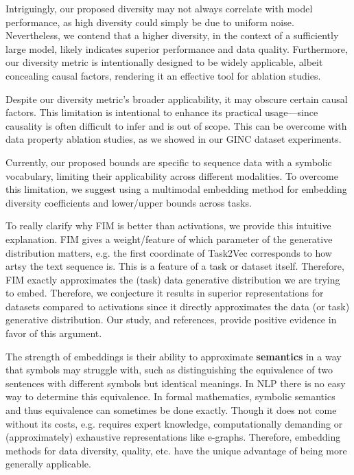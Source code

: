 Intriguingly, our proposed diversity may not always correlate with model performance, as high diversity could simply be due to uniform noise. 
Nevertheless, we contend that a higher diversity, in the context of a sufficiently large model, likely indicates superior performance and data quality. 
Furthermore, our diversity metric is intentionally designed to be widely applicable, albeit concealing causal factors, rendering it an effective tool for ablation studies.

Despite our diversity metric's broader applicability, it may obscure certain causal factors. 
This limitation is intentional to enhance its practical usage---since causality is often difficult to infer and is out of scope.
This can be overcome with data property ablation studies, as we showed in our GINC dataset experiments. 

Currently, our proposed bounds are specific to sequence data with a symbolic vocabulary, limiting their applicability across different modalities. 
To overcome this limitation, we suggest using a multimodal embedding method for embedding diversity coefficients and lower/upper bounds across tasks.

To really clarify why FIM is better than activations, we provide this intuitive explanation. FIM gives a weight/feature of which parameter of the generative distribution matters, 
e.g. the first coordinate of Task2Vec corresponds to how artsy the text sequence is. 
This is a feature of a task or dataset itself. Therefore, FIM exactly approximates the (task) data generative distribution we are trying to embed. 
Therefore, we conjecture it results in superior representations for datasets compared to activations since it directly approximates the data (or task) generative distribution.
Our study, and references, provide positive evidence in favor of this argument.

The strength of embeddings is their ability to approximate \textbf{semantics} in a way that symbols may struggle with, such as distinguishing the equivalence of two sentences with different symbols but identical meanings. 
In NLP there is no easy way to determine this equivalence. In formal mathematics, symbolic semantics and thus equivalence can sometimes be done exactly. 
Though it does not come without its costs, e.g. requires expert knowledge, computationally demanding or (approximately) exhaustive representations like e-graphs. 
Therefore, embedding methods for data diversity, quality, etc. have the unique advantage of being more generally applicable. 

